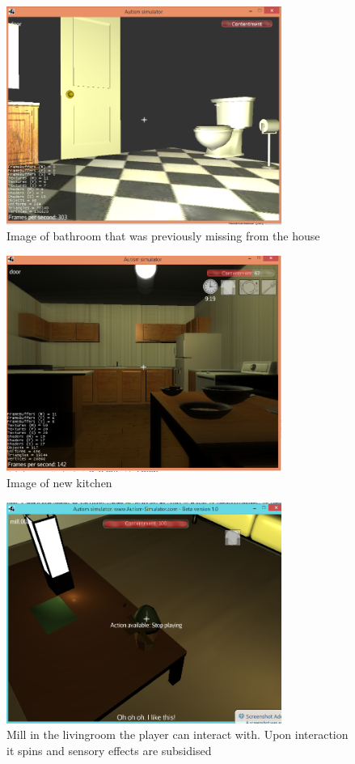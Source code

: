 \documentclass[11pt]{report}
\begin{document}
\begin{figure}[H]
\centering
\includegraphics[width=90mm]{images/new_bathroom.png}
\caption{Image of bathroom that was previously missing from the house}
\label{old_house}
\end{figure}


\begin{figure}[H]
\centering
\includegraphics[width=90mm]{images/implementationfirst/gameimages/kitchen.png}
\caption{Image of new kitchen}
\label{old_house}
\end{figure}

\begin{figure}[H]
\centering
\includegraphics[width=90mm]{images/implementationfirst/gameimages/mill.png}
\caption{Mill in the livingroom the player can interact with. Upon interaction it spins and sensory effects are subsidised}
\label{old_house}
\end{figure}
\end{document}
